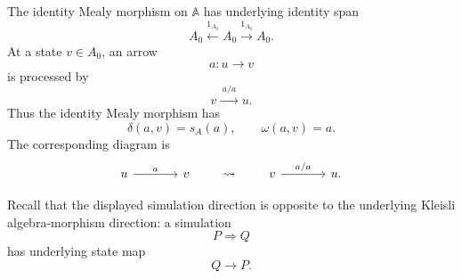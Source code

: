 The identity Mealy morphism on \(\mathbb A\) has underlying identity span
\[
    A_0\xleftarrow{1_{A_0}}A_0\xrightarrow{1_{A_0}}A_0.
\]
At a state \(v\in A_0\), an arrow
\[
    a:u\to v
\]
is processed by
\[
    v
    \xrightarrow{\;a/a\;}
    u.
\]
Thus the identity Mealy morphism has
\[
    \delta(a,v)=s_A(a),
    \qquad
    \omega(a,v)=a.
\]
The corresponding diagram is
\[
    \begin{tikzcd}[column sep=large]
            u 
                \arrow[r, "a"] 
        & 
            v
    \end{tikzcd}
    \qquad\leadsto\qquad
    \begin{tikzcd}[column sep=large]
            v 
                \arrow[r, "{a/a}"] 
        & 
            u.
    \end{tikzcd}
\]

Recall that the displayed simulation direction is opposite to the underlying Kleisli algebra-morphism direction: a simulation
\[
    P\Rightarrow Q
\]
has underlying state map
\[
    Q\to P.
\]

